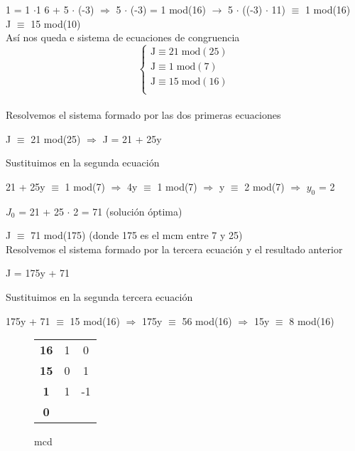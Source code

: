 \documentclass[13pt]{article}
\begin{document}
1 = 1 $\cdot$1 6 + 5 $\cdot$ (-3) $\Rightarrow$ 5 $\cdot$ (-3) = 1 mod(16) $\rightarrow$ 5 $\cdot$ ((-3) $\cdot$ 11) $\equiv$ 1 mod(16)\\
\hspace*{0.5cm}J $\equiv$ 15 mod(10)
\\

Así nos queda e sistema de ecuaciones de congruencia
\[
	\begin{cases}
	\text{J} \equiv 21\; \text{mod}(25)\\
	\text{J} \equiv 1\; \text{mod}(7)\\
	\text{J} \equiv 15\; \text{mod}(16)\\
\end{cases}
\]
\\

Resolvemos el sistema formado por las dos primeras ecuaciones

J $\equiv$ 21 mod(25) $\Rightarrow$ J = 21 + 25y

Sustituimos en la segunda ecuación

21 + 25y $\equiv$ 1 mod(7) $\Rightarrow$ 4y $\equiv$ 1 mod(7) $\Rightarrow$ y $\equiv$ 2 mod(7) $\Rightarrow$ $y_{0}$ = 2

$J_{0}$ = 21 + 25 $\cdot$ 2 = 71  (solución óptima)

J $\equiv$ 71 mod(175)  (donde 175 es el mcm entre 7 y 25)
\\

Resolvemos el sistema formado por la tercera ecuación y el resultado anterior

J = 175y + 71

Sustituimos en la segunda tercera ecuación

175y + 71 $\equiv$ 15 mod(16) $\Rightarrow$ 175y $\equiv$ 56 mod(16) $\Rightarrow$ 15y $\equiv$ 8 mod(16)



\begin{figure}[H]
\begin{center}
\caption{mcd}
\label{my-label}
\begin{tabular}[(b)]{|c|cc}
\cline{1-1}
\textbf{16} & 1                    & 0                    \\ \cline{1-1}
\textbf{15}  & 0                    & 1                    \\ \cline{1-1}
\textbf{1}           & 1                    & -1                   \\ \cline{1-1}
\textbf{0}           & \multicolumn{1}{l}{} & \multicolumn{1}{l}{} \\ \cline{1-1}
\end{tabular}
\end{center}
\end{figure}
\end{document}
